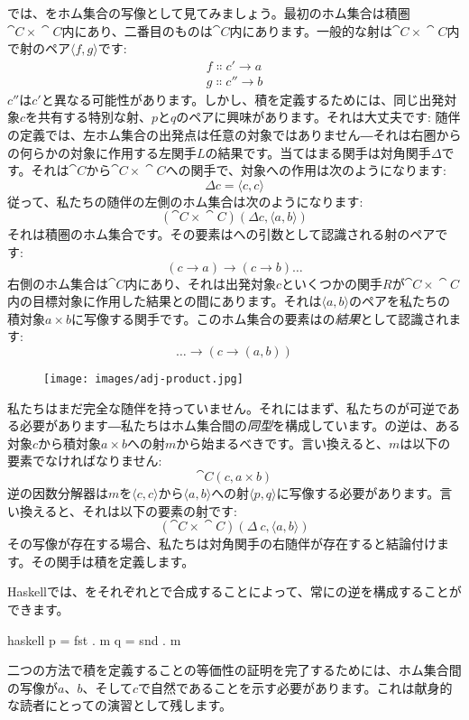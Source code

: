 では、をホム集合の写像として見てみましょう。最初のホム集合は積圏$\cat{C}\times{}\cat{C}$内にあり、二番目のものは$\cat{C}$内にあります。一般的な射は$\cat{C}\times{}\cat{C}$内で射のペア$\langle f, g \rangle$です: 
\begin{gather*}
  f \Colon c' \to a \\
  g \Colon c'' \to b
\end{gather*}
$c''$は$c'$と異なる可能性があります。しかし、積を定義するためには、同じ出発対象$c$を共有する特別な射、$p$と$q$のペアに興味があります。それは大丈夫です: 随伴の定義では、左ホム集合の出発点は任意の対象ではありません―それは右圏からの何らかの対象に作用する左関手$L$の結果です。当てはまる関手は対角関手$\Delta$です。それは$\cat{C}$から$\cat{C}\times{}\cat{C}$への関手で、対象への作用は次のようになります: 
\[\Delta c = \langle c, c \rangle\]
従って、私たちの随伴の左側のホム集合は次のようになります: 
\[(\cat{C}\times{}\cat{C})(\Delta c, \langle a, b \rangle)\]
それは積圏のホム集合です。その要素はへの引数として認識される射のペアです: 
\[(c \to a) \to (c \to b) \ldots{}\]
右側のホム集合は$\cat{C}$内にあり、それは出発対象$c$といくつかの関手$R$が$\cat{C}\times{}\cat{C}$内の目標対象に作用した結果との間にあります。それは$\langle a, b \rangle$のペアを私たちの積対象$a\times{}b$に写像する関手です。このホム集合の要素はの\emph{結果}として認識されます: 
\[\ldots{} \to (c \to (a, b))\]

\begin{figure}[H]
  \centering
  \texttt{[image: images/adj-product.jpg]}
\end{figure}

\noindent
私たちはまだ完全な随伴を持っていません。それにはまず、私たちのが可逆である必要があります―私たちはホム集合間の\emph{同型}を構成しています。の逆は、ある対象$c$から積対象$a\times{}b$への射$m$から始まるべきです。言い換えると、$m$は以下の要素でなければなりません: 
\[\cat{C}(c, a\times{}b)\]
逆の因数分解器は$m$を$\langle c, c \rangle$から$\langle a, b \rangle$への射$\langle p, q \rangle$に写像する必要があります。言い換えると、それは以下の要素の射です: 
\[(\cat{C}\times{}\cat{C})(\Delta\ c, \langle a, b \rangle)\]
その写像が存在する場合、私たちは対角関手の右随伴が存在すると結論付けます。その関手は積を定義します。

Haskellでは、をそれぞれとで合成することによって、常にの逆を構成することができます。

\begin{snip}{haskell}
p = fst . m
q = snd . m
\end{snip}
二つの方法で積を定義することの等価性の証明を完了するためには、ホム集合間の写像が$a$、$b$、そして$c$で自然であることを示す必要があります。これは献身的な読者にとっての演習として残します。

